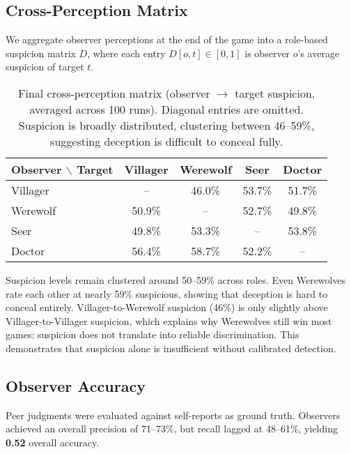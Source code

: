 \documentclass{article}
\begin{document}
\subsection{Cross-Perception Matrix}
We aggregate observer perceptions at the end of the game into a role-based suspicion matrix $D$, where each entry $D[o,t]\in[0,1]$ is observer $o$’s average suspicion of target $t$.

\begin{table}[h]
\centering
\caption{Final cross-perception matrix (observer $\rightarrow$ target suspicion, averaged across 100 runs). Diagonal entries are omitted. Suspicion is broadly distributed, clustering between 46--59\%, suggesting deception is difficult to conceal fully.}
\label{tab:cross_perception}
\begin{tabular}{lcccc}
\toprule
\textbf{Observer $\backslash$ Target} & Villager & Werewolf & Seer & Doctor \\
\midrule
Villager & -- & 46.0\% & 53.7\% & 51.7\% \\
Werewolf & 50.9\% & -- & 52.7\% & 49.8\% \\
Seer     & 49.8\% & 53.3\% & -- & 53.8\% \\
Doctor   & 56.4\% & 58.7\% & 52.2\% & -- \\
\bottomrule
\end{tabular}
\end{table}

Suspicion levels remain clustered around 50--59\% across roles. Even Werewolves rate each other at nearly 59\% suspicious, showing that deception is hard to conceal entirely. Villager-to-Werewolf suspicion (46\%) is only slightly above Villager-to-Villager suspicion, which explains why Werewolves still win most games: suspicion does not translate into reliable discrimination. This demonstrates that suspicion alone is insufficient without calibrated detection.

\subsection{Observer Accuracy}
Peer judgments were evaluated against self-reports as ground truth. Observers achieved an overall precision of 71--73\%, but recall lagged at 48--61\%, yielding \textbf{0.52} overall accuracy.
\end{document}
